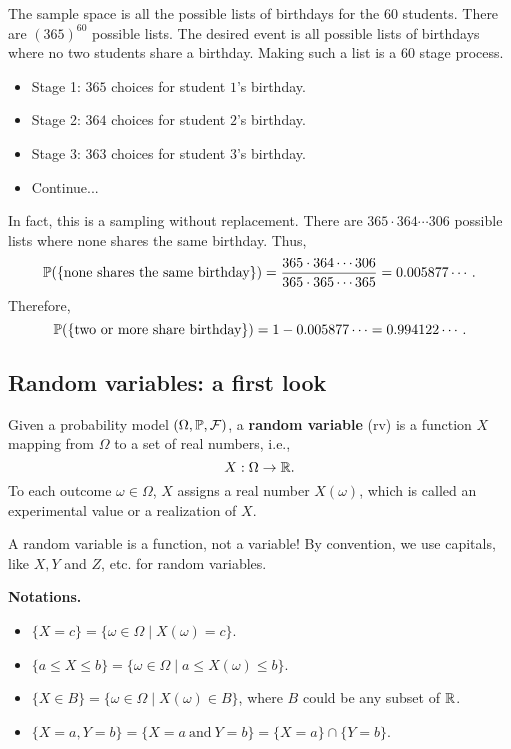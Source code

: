   The sample space is all the possible lists of birthdays for the $60$ students.
  There are $(365)^{60}$ possible lists. The desired event is all possible lists
  of birthdays where no two students share a birthday. Making such a list is a
  $60$ stage process.
  \begin{itemize}
  \item Stage 1: $365$ choices for student $1$'s birthday.
  \item Stage 2: $364$ choices for student $2$'s birthday.
  \item Stage 3: $363$ choices for student $3$'s birthday.
  \item Continue...
  \end{itemize}
  In fact, this is a sampling without replacement. There are $365\cdot 364\cdots
  306$ possible lists where none shares the same birthday. Thus,
  \[
    \mathbb{P}(\{\text{none shares the same birthday}\}) = \frac{365\cdot 364\cdots
      306}{365\cdot 365\cdots 365} = 0.005877\cdots.
  \]
  Therefore,
  \[
    \mathbb{P}(\{\text{two or more share birthday}\}) = 1- 0.005877\cdots = 0.994122\cdots.
  \]


  \subsection{Random variables: a first look}
  \label{subsec:1.5}
  \begin{definition}
    Given a probability model $(\Omega, \mathbb{P}, \mathcal{F})$, a \textbf{random variable} (rv) is a
   function $X$ mapping from $\Omega$ to a set of real numbers, i.e.,
   \[
     X: \Omega \to \mathbb{R}.
   \]
   To each outcome $\omega\in \Omega$, $X$ assigns a real number $X(\omega)$,
   which is called an experimental value or a realization of $X$.
 \end{definition}
 
  \begin{remark}
   A random variable is a function, not a variable! By convention, we use
   capitals, like $X, Y$  and $Z$, etc. for random variables. 
  \end{remark}
  \textbf{Notations.}
  \begin{itemize}
  \item $\{X = c\} = \{\omega\in \Omega\mid X(\omega) = c\}$.
  \item $\{a\le X\le b\} = \{\omega\in \Omega\mid a\le X(\omega)\le b\}$.
  \item $\{X\in B\} = \{\omega\in \Omega\mid X(\omega)\in B\}$, where $B$ could
    be any subset of $\mathbb{R}$.
  \item $\{X = a, Y = b\} = \{X=a~\text{and}~Y=b\} = \{X=a\}\cap \{Y = b\}$.
  \end{itemize}

